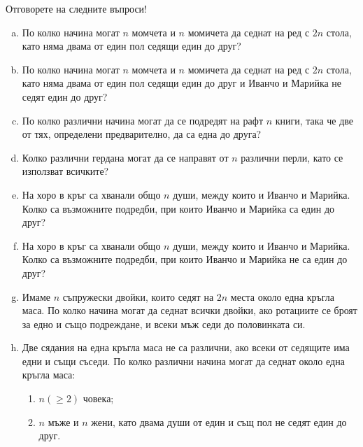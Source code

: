 \begin{problem}
  Отговорете на следните въпроси!
  \begin{enumerate}[a)]
  \item
    По колко начина могат $n$ момчета и $n$ момичета да седнат на ред с $2n$ стола, като няма двама от един пол седящи един до друг?
  \item
    По колко начина могат $n$ момчета и $n$ момичета да седнат на ред с $2n$ стола, като няма двама от един пол седящи един до друг и Иванчо и Марийка не седят един до друг? 
  \item
    По колко различни начина могат да се подредят на рафт $n$ книги, така че две от тях, определени предварително, да са една до друга?
  \item
    Колко различни гердана могат да се направят от $n$ различни перли, като се използват всичките?
  \item
    На хоро в кръг са хванали общо $n$ души, между които и Иванчо и Марийка.
    Колко са възможните подредби, при които Иванчо и Марийка са един до друг?
 \item
    На хоро в кръг са хванали общо $n$ души, между които и Иванчо и Марийка.
    Колко са възможните подредби, при които Иванчо и Марийка не са един до друг?
  \item
    Имаме $n$ съпружески двойки, които седят на $2n$ места около една кръгла маса. 
    По колко начина могат да седнат всички двойки, ако ротациите се броят за едно и също подреждане, и
    всеки мъж седи до половинката си.
  \item
    Две сядания на една кръгла маса не са различни, ако всеки от седящите има едни и същи съседи.
    По колко различни начина могат да седнат около една кръгла маса:
    \begin{enumerate}
    \item
      $n (\geq 2)$ човека;
    \item
      $n$ мъже и $n$ жени, като двама души от един и същ пол не седят един до друг.
    \end{enumerate}
  \end{enumerate}
\end{problem}


